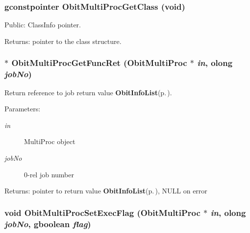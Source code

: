 \subsubsection{\setlength{\rightskip}{0pt plus 5cm}gconstpointer Obit\-Multi\-Proc\-Get\-Class (void)}\label{ObitMultiProc_8h_a14}


Public: Class\-Info pointer. 

\begin{Desc}
\item[Returns:]pointer to the class structure. \end{Desc}
\subsubsection{$\ast$ Obit\-Multi\-Proc\-Get\-Func\-Ret ({\bf Obit\-Multi\-Proc} $\ast$ {\em in}, {\bf olong} {\em job\-No})}\label{ObitMultiProc_8h_a13}


Return reference to job return value {\bf Obit\-Info\-List}{\rm (p.\,\pageref{structObitInfoList})}. 

\begin{Desc}
\item[Parameters:]
\begin{description}
\item[{\em in}]Multi\-Proc object \item[{\em job\-No}]0-rel job number \end{description}
\end{Desc}
\begin{Desc}
\item[Returns:]pointer to return value {\bf Obit\-Info\-List}{\rm (p.\,\pageref{structObitInfoList})}, NULL on error \end{Desc}
\subsubsection{\setlength{\rightskip}{0pt plus 5cm}void Obit\-Multi\-Proc\-Set\-Exec\-Flag ({\bf Obit\-Multi\-Proc} $\ast$ {\em in}, {\bf olong} {\em job\-No}, gboolean {\em flag})}\label{ObitMultiProc_8h_a11}


